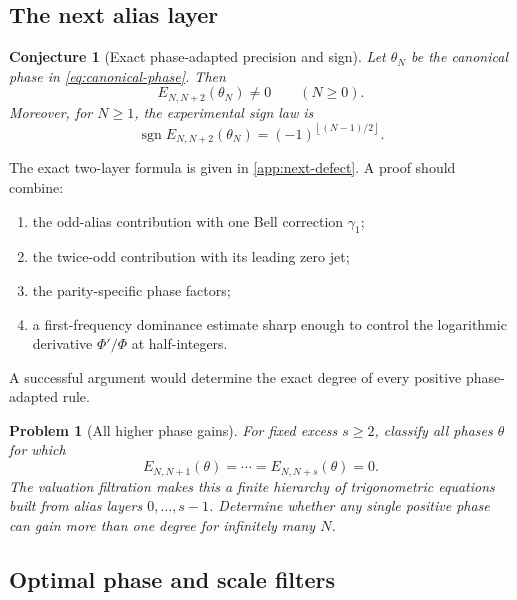 \documentclass[11pt]{article}
\numberwithin{equation}{section}
\newtheorem{conjecture}[theorem]{Conjecture}
\newtheorem{problem}[theorem]{Problem}
\theoremstyle{definition}
\theoremstyle{remark}
\DeclareMathOperator{\sgn}{sgn}
\newcommand{\floor}[1]{\left\lfloor#1\right\rfloor}
\begin{document}
\subsection{The next alias layer}

\begin{conjecture}[Exact phase-adapted precision and sign]
\label{conj:next-defect-sign}
Let $\theta_N$ be the canonical phase in \eqref{eq:canonical-phase}.  Then
\begin{equation}
 E_{N,N+2}(\theta_N)\ne0
 \qquad(N\ge0).
 \label{eq:next-defect-nonzero}
\end{equation}
Moreover, for $N\ge1$, the experimental sign law is
\begin{equation}
 \sgn E_{N,N+2}(\theta_N)
 =(-1)^{\floor{(N-1)/2}}.
 \label{eq:next-defect-sign-conj}
\end{equation}
\end{conjecture}

The exact two-layer formula is given in \cref{app:next-defect}.  A proof should combine:
\begin{enumerate}
\item the odd-alias contribution with one Bell correction $\gamma_1$;
\item the twice-odd contribution with its leading zero jet;
\item the parity-specific phase factors;
\item a first-frequency dominance estimate sharp enough to control the logarithmic derivative $\Phi'/\Phi$ at half-integers.
\end{enumerate}
A successful argument would determine the exact degree of every positive phase-adapted rule.

\begin{problem}[All higher phase gains]
\label{prob:higher-phase-gains}
For fixed excess $s\ge2$, classify all phases $\theta$ for which
\[
 E_{N,N+1}(\theta)=\cdots=E_{N,N+s}(\theta)=0.
\]
The valuation filtration makes this a finite hierarchy of trigonometric equations built from alias layers $0,\ldots,s-1$.  Determine whether any single positive phase can gain more than one degree for infinitely many $N$.
\end{problem}

\subsection{Optimal phase and scale filters}
\end{document}
